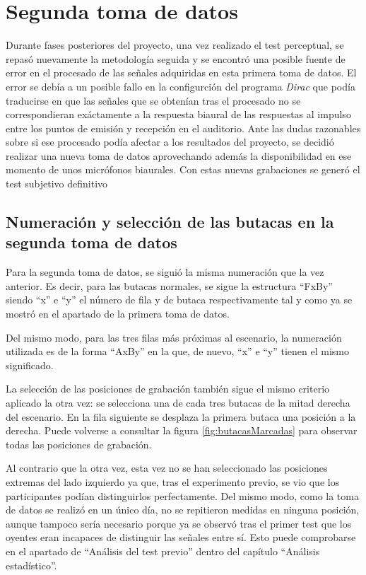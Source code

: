 \documentclass[11pt,a4paper]{book}
\begin{document}
                
            
    \section{Segunda toma de datos}
        Durante fases posteriores del proyecto, una vez realizado el test perceptual, se repasó nuevamente la metodología seguida y se encontró una posible fuente de error en el procesado de las señales adquiridas en esta primera toma de datos. El error se debía a un posible fallo en la configurción del programa \textit{Dirac} que podía traducirse en que las señales que se obtenían tras el procesado no se correspondieran exáctamente a la respuesta biaural de las respuestas al impulso entre los puntos de emisión y recepción en el auditorio.  Ante las dudas razonables sobre si ese procesado podía afectar a los resultados del proyecto, se decidió realizar una nueva toma de datos aprovechando además la disponibilidad en ese momento de unos micrófonos biaurales. Con estas nuevas grabaciones se generó el test subjetivo definitivo
        
        
       \subsection{Numeración y selección de las butacas en la segunda toma de datos}
            Para la segunda toma de datos, se siguió la misma numeración que la vez anterior. Es decir, para las butacas normales, se sigue la estructura ``FxBy'' siendo ``x'' e ``y'' el número de fila y de butaca respectivamente tal y como ya se mostró en el apartado de la primera toma de datos.
                
            Del mismo modo, para las tres filas más próximas al escenario, la numeración utilizada es de la forma ``AxBy'' en la que, de nuevo, ``x'' e ``y'' tienen el mismo significado.\newline
                
            La selección de las posiciones de grabación también sigue el mismo criterio aplicado la otra vez: se selecciona una de cada tres butacas de la mitad derecha del escenario. En la fila siguiente se desplaza la primera butaca una posición a la derecha. Puede volverse a consultar la figura \ref{fig:butacasMarcadas} para observar todas las posiciones de grabación.
                
            Al contrario que la otra vez, esta vez no se han seleccionado las posiciones extremas del lado izquierdo ya que, tras el experimento previo, se vio que los participantes podían distinguirlos perfectamente. Del mismo modo, como la toma de datos se realizó en un único día, no se repitieron medidas en ninguna posición, aunque tampoco sería necesario porque ya se observó tras el primer test que los oyentes eran incapaces de distinguir las señales entre sí. Esto puede comprobarse en el apartado de ``Análisis del test previo'' dentro del capítulo ``Análisis estadístico''.
                
\end{document}
